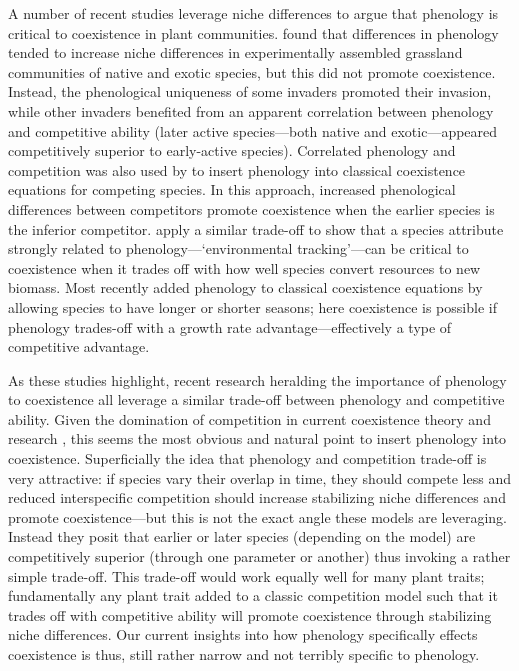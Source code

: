 \documentclass[11pt]{article}
\begin{document}
A number of recent studies leverage niche differences to argue that phenology is critical to coexistence in plant communities. \citet{godoy2014} found that differences in phenology tended to increase niche differences in experimentally assembled grassland communities of native and exotic species, but this did not promote coexistence. Instead, the phenological uniqueness of some invaders promoted their invasion, while other invaders benefited from an apparent correlation between phenology and competitive ability (later active species---both native and exotic---appeared competitively superior to early-active species). Correlated phenology and competition was also used by \citet{rudolf2019role} to insert phenology into classical coexistence equations for competing species. In this approach, increased phenological differences between competitors promote coexistence when the earlier species is the inferior competitor. \citet{wolkovich2021phenological} apply a similar trade-off to show that a species attribute strongly related to phenology---`environmental tracking'---can be critical to coexistence when it trades off with how well species convert resources to new biomass. Most recently \citet{levine2022competition} added phenology to classical coexistence equations by allowing species to have longer or shorter seasons; here coexistence is possible if phenology trades-off with a growth rate advantage---effectively a type of competitive advantage.  

As these studies highlight, recent research heralding the importance of phenology to coexistence all leverage a similar trade-off between phenology and competitive ability. Given the domination of competition in current coexistence theory and research \citep{mcpeek2022coexistence}, this seems the most obvious and natural point to insert phenology into coexistence. Superficially the idea that phenology and competition trade-off is very attractive: if species vary their overlap in time, they should compete less and reduced interspecific competition should increase stabilizing niche differences and promote coexistence---but this is not the exact angle these models are leveraging. Instead they posit that earlier or later species (depending on the model) are competitively superior (through one parameter or another) thus invoking a rather simple trade-off. This trade-off would work equally well for many plant traits; fundamentally any plant trait added to a classic competition model such that it trades off with competitive ability will promote coexistence through stabilizing niche differences. Our current insights into how phenology specifically effects coexistence is thus, still rather narrow and not terribly specific to phenology. 
\end{document}
